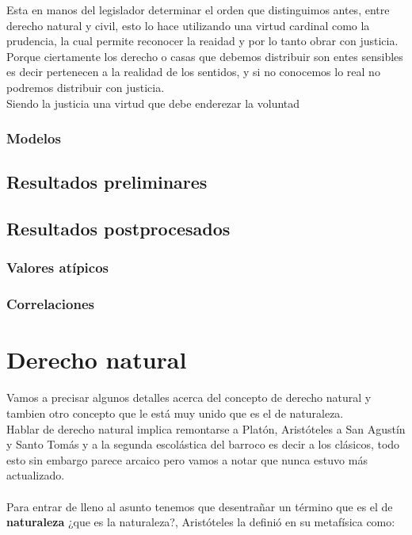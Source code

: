 \documentclass[12pt]{book}
\begin{document}
Esta en manos del legislador determinar el orden que distinguimos antes, entre derecho natural y civil, esto lo hace utilizando una virtud cardinal como la prudencia, la cual permite reconocer la reaidad y por lo tanto obrar con justicia.
Porque ciertamente los derecho o casas que debemos distribuir son entes sensibles es decir pertenecen a la realidad de los sentidos, y si no conocemos lo real no podremos distribuir con justicia.
\\
Siendo la justicia una virtud que debe enderezar la voluntad
\subsection{Modelos}
\section{Resultados preliminares}
\section{Resultados postprocesados}
\subsection{Valores atípicos}
\subsection{Correlaciones}
\chapter{Derecho natural}
Vamos a precisar algunos detalles acerca del concepto de derecho natural y tambien otro concepto que le está muy unido que es el de naturaleza.
\\
Hablar de derecho natural implica remontarse a Platón, Aristóteles a San Agustín y Santo Tomás y a la segunda escolástica del barroco es decir a los clásicos, todo esto sin embargo parece arcaico pero vamos a notar que nunca estuvo más actualizado.
\\ \\
Para entrar de lleno al asunto tenemos que desentrañar un término que es el de \textbf{naturaleza} ¿que es la naturaleza?, Aristóteles la definió en su metafísica como: \\
\end{document}
